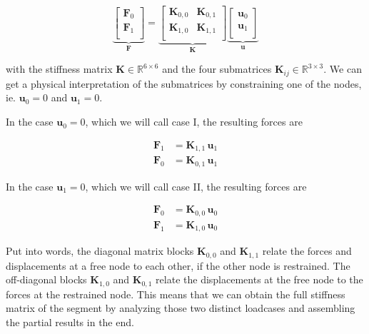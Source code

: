 \begin{equation}
\underbrace{
\begin{bmatrix}
\boldsymbol{F}_0 \\
\boldsymbol{F}_1 \\
\end{bmatrix}
}_{\boldsymbol{F}}
=
\underbrace{
\begin{bmatrix}
\boldsymbol{K}_{0,0} & \boldsymbol{K}_{0,1} \\
\boldsymbol{K}_{1,0} & \boldsymbol{K}_{1,1} \\
\end{bmatrix}
}_{\boldsymbol{K}}
\underbrace{
\begin{bmatrix}
\boldsymbol{u}_0 \\
\boldsymbol{u}_1 \\
\end{bmatrix}
}_{\boldsymbol{u}}
\end{equation}

with the stiffness matrix $\boldsymbol{K} \in \mathbb{R}^{6 \times 6}$ and the four submatrices $\boldsymbol{K}_{ij} \in \mathbb{R}^{3 \times 3}$.
We can get a physical interpretation of the submatrices by constraining one of the nodes, ie. $\boldsymbol{u}_{0} = 0$ and $\boldsymbol{u}_{1} = 0$.

In the case $\boldsymbol{u}_{0} = 0$, which we will call case I, the resulting forces are

\begin{align}
\boldsymbol{F}_1 &= \boldsymbol{K}_{1,1}\,\boldsymbol{u}_1 \\
\boldsymbol{F}_0 &= \boldsymbol{K}_{0,1}\,\boldsymbol{u}_1
\end{align}

In the case $\boldsymbol{u}_{1} = 0$, which we will call case II, the resulting forces are

\begin{align}
\boldsymbol{F}_0 &= \boldsymbol{K}_{0,0}\,\boldsymbol{u}_0 \\
\boldsymbol{F}_1 &= \boldsymbol{K}_{1,0}\,\boldsymbol{u}_0
\end{align}

Put into words, the diagonal matrix blocks $\boldsymbol{K}_{0,0}$ and $\boldsymbol{K}_{1,1}$ relate the forces and displacements at a free node to each other, if the other node is restrained.
The off-diagonal blocks $\boldsymbol{K}_{1,0}$ and $\boldsymbol{K}_{0,1}$ relate the displacements at the free node to the forces at the restrained node.
This means that we can obtain the full stiffness matrix of the segment by analyzing those two distinct loadcases and assembling the partial results in the end.

